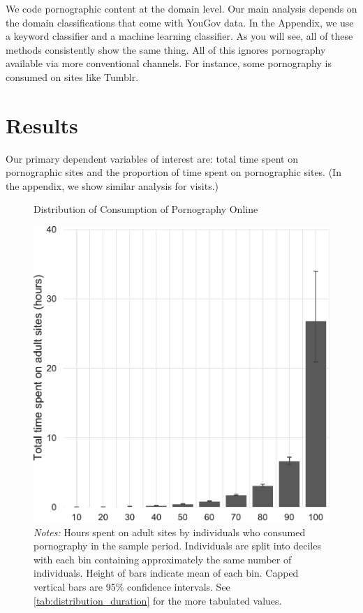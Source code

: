 \documentclass[12pt, letterpaper]{article}
\begin{document}
We code pornographic content at the domain level. Our main analysis depends on the domain classifications that come with YouGov data. In the Appendix, we use a keyword classifier and a machine learning classifier. As you will see, all of these methods consistently show the same thing. All of this ignores pornography available via more conventional channels. For instance, some pornography is consumed on sites like Tumblr.

\section*{Results}

Our primary dependent variables of interest are: total time spent on pornographic sites and the proportion of time spent on pornographic sites. (In the appendix, we show similar analysis for visits.) 

\begin{figure}[h]
\centering
\caption{Distribution of Consumption of Pornography Online}
\includegraphics[width=.55\linewidth]{../figs/distribution_duration_on_adultsites.pdf}
\caption*{\footnotesize \emph{Notes:} 
	Hours spent on adult sites by individuals who consumed pornography in the sample period.
	Individuals are split into deciles with each bin containing approximately the same number of individuals.
	Height of bars indicate mean of each bin.
	Capped vertical bars are 95\% confidence intervals.
	See \cref{tab:distribution_duration} for the more tabulated values.
}
\label{fig:distribution_duration}
\end{figure}
\end{document}
